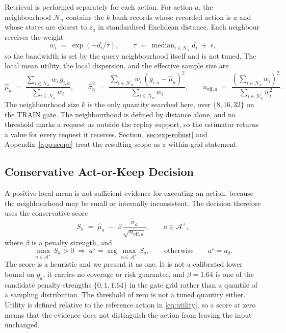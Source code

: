 \documentclass{article}
\newcommand{\calA}{\mathcal{A}}
\newcommand{\calN}{\mathcal{N}}
\begin{document}
Retrieval is performed separately for each action. For action $a$, the neighbourhood
$\calN_a$ contains the $k$ bank records whose recorded action is $a$ and whose states are
closest to $z_a$ in standardised Euclidean distance. Each neighbour receives the weight
\begin{equation}
  w_i \;=\; \exp\!\left(-d_i / \tau\right),
  \qquad
  \tau \;=\; \operatorname{median}_{i \in \calN_a} d_i \;+\; \epsilon ,
  \label{eq:weights}
\end{equation}
so the bandwidth is set by the query neighbourhood itself and is not tuned. The local mean
utility, the local dispersion, and the effective sample size are
\begin{equation}
  \hat\mu_a \;=\; \frac{\sum_{i \in \calN_a} w_i\, g_{i,a}}{\sum_{i \in \calN_a} w_i},
  \qquad
  \hat\sigma_a^{2} \;=\; \frac{\sum_{i \in \calN_a} w_i\, (g_{i,a} - \hat\mu_a)^{2}}{\sum_{i \in \calN_a} w_i},
  \qquad
  n_{\mathrm{eff},a} \;=\; \frac{\left(\sum_{i \in \calN_a} w_i\right)^{2}}{\sum_{i \in \calN_a} w_i^{2}} .
  \label{eq:local-moments}
\end{equation}
The neighbourhood size $k$ is the only quantity searched here, over $\{8, 16, 32\}$ on the
TRAIN gate. The neighbourhood is defined by distance alone, and no threshold marks a request as
outside the replay support, so the estimator returns a value for every request it receives.
Section~\ref{sec:exp-robust} and Appendix~\ref{app:scope} treat the resulting scope as a
within-grid statement.

\subsection{Conservative Act-or-Keep Decision}
\label{sec:method-decision}
A positive local mean is not sufficient evidence for executing an action, because the
neighbourhood may be small or internally inconsistent. The decision therefore uses the
conservative score
\begin{equation}
  S_a \;=\; \hat\mu_a \;-\; \beta\, \frac{\hat\sigma_a}{\sqrt{n_{\mathrm{eff},a}}},
  \qquad a \in \calA^{+},
  \label{eq:score}
\end{equation}
where $\beta$ is a penalty strength, and
\begin{equation}
  \max_{a \in \calA^{+}} S_a > 0
  \;\Rightarrow\;
  a^{\star} = \arg\max_{a \in \calA^{+}} S_a ,
  \qquad\text{otherwise}\qquad
  a^{\star} = a_0 .
  \label{eq:decision}
\end{equation}
The score is a heuristic and we present it as one. It is not a calibrated lower bound on
$g_a$, it carries no coverage or risk guarantee, and $\beta = 1.64$ is one of the candidate
penalty strengths $\{0, 1, 1.64\}$ in the gate grid rather than a quantile of a sampling
distribution. The threshold of zero is not a tuned quantity either. Utility is defined relative
to the reference action in \eqref{eq:utility}, so a score at zero means that the evidence does
not distinguish the action from leaving the input unchanged.
\end{document}
